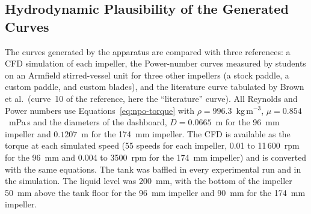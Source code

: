 \subsection{Hydrodynamic Plausibility of the Generated Curves}
\label{subsec:agit-plausibility}

The curves generated by the apparatus are compared with three references: a CFD simulation of each impeller, the Power-number curves measured by students on an Armfield stirred-vessel unit for three other impellers (a stock paddle, a custom paddle, and custom blades), and the literature curve tabulated by Brown et al.\ (curve~10 of the reference, here the ``literature'' curve). %
All Reynolds and Power numbers use Equations~\ref{eq:npo-torque} with $\rho = 996.3$~kg\,m$^{-3}$, $\mu = 0.854$~mPa\,s and the diameters of the dashboard, $D = 0.0665$~m for the 96~mm impeller and $0.1207$~m for the 174~mm impeller. The CFD is available as the torque at each simulated speed (55 speeds for each impeller, 0.01 to 11\,600~rpm for the 96~mm and 0.004 to 3500~rpm for the 174~mm impeller) and is converted with the same equations. The tank was baffled in every experimental run and in the simulation. The liquid level was 200~mm, with the bottom of the impeller 50~mm above the tank floor for the 96~mm impeller and 90~mm for the 174~mm impeller.


